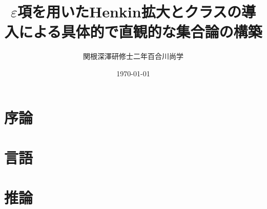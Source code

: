 \documentclass[a4j,10.5pt,oneside,openany]{jsreport}
\title{$\varepsilon$項を用いたHenkin拡大とクラスの導入による具体的で直観的な集合論の構築}
\author{関根深澤研修士二年百合川尚学}
\date{\today}
\theoremstyle{mystyle}
\begin{document}
\maketitle
\tableofcontents

%
\chapter{序論}
	

\chapter{言語}
	
	
	
	
	
	
	
	

\chapter{推論}
\label{chap:inference}
	
	
	
	
%	
\end{document}
